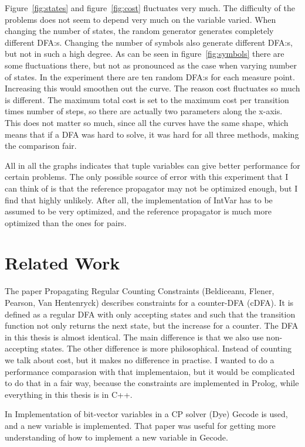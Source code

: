 \documentclass[a4paper,11pt]{article}
\begin{document}
Figure~\ref{fig:states} and figure~\ref{fig:cost} fluctuates very much. The difficulty of the problems does not seem to depend very much on the variable varied. When changing the number of states, the random generator generates completely different DFA:s. Changing the number of symbols also generate different DFA:s, but not in such a high degree. As can be seen in figure~\ref{fig:symbols} there are some fluctuations there, but not as pronounced as the case when varying number of states. In the experiment there are ten random DFA:s for each measure point. Increasing this would smoothen out the curve. The reason cost fluctuates so much is different. The maximum total cost is set to the maximum cost per transition times number of steps, so there are actually two parameters along the x-axis. This does not matter so much, since all the curves have the same shape, which means that if a DFA was hard to solve, it was hard for all three methods, making the comparison fair. 

All in all the graphs indicates that tuple variables can give better performance for certain problems. The only possible source of error with this experiment that I can think of is that the reference propagator may not be optimized enough, but I find that highly unlikely. After all, the implementation of IntVar has to be assumed to be very optimized, and the reference propagator is much more optimized than the ones for pairs.

\section{Related Work}
The paper Propagating Regular Counting Constraints (Beldiceanu, Flener, Pearson, Van Hentenryck) describes constraints for a counter-DFA (cDFA). It is defined as a regular DFA with only accepting states and such that the transition function not only returns the next state, but the increase for a counter. The DFA in this thesis is almost identical. The main difference is that we also use non-accepting states. The other difference is more philosophical. Instead of counting we talk about cost, but it makes no difference in practise. I wanted to do a performance comparasion with that implementaion, but it would be complicated to do that in a fair way, because the constraints are implemented in Prolog, while everything in this thesis is in C++.

In Implementation of bit-vector variables in a CP solver (Dye) Gecode is used, and a new variable is implemented. That paper was useful for getting more understanding of how to implement a new variable in Gecode.
\end{document}

